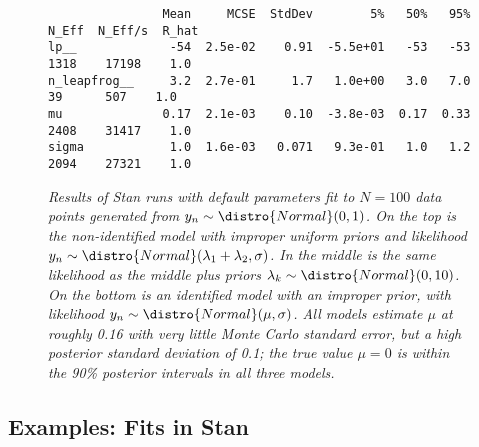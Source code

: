 \begin{figure}
\begin{Verbatim}
                Mean     MCSE  StdDev        5%   50%   95%  N_Eff  N_Eff/s  R_hat
lp__             -54  2.5e-02    0.91  -5.5e+01   -53   -53   1318    17198    1.0
n_leapfrog__     3.2  2.7e-01     1.7   1.0e+00   3.0   7.0     39      507    1.0
mu              0.17  2.1e-03    0.10  -3.8e-03  0.17  0.33   2408    31417    1.0
sigma            1.0  1.6e-03   0.071   9.3e-01   1.0   1.2   2094    27321    1.0
\end{Verbatim}
%
\caption{\small\it Results of Stan runs with default parameters fit to
  $N=100$ data points generated from $y_n \sim \distro{Normal}(0,1)$.
  On the top is the non-identified model with improper uniform priors
  and likelihood $y_n \sim \distro{Normal}(\lambda_1 + \lambda_2,
  \sigma)$. 
  In the middle is the same likelihood as the middle plus priors
  $\lambda_k \sim \distro{Normal}(0,10)$. 
  On the bottom is an identified model with an improper prior, with
  likelihood  $y_n \sim \distro{Normal}(\mu,\sigma)$.  All models
  estimate $\mu$ at roughly 0.16 with very little Monte Carlo standard
  error, but a high posterior standard deviation of 0.1;  the true
  value $\mu=0$ is within the 90\% posterior intervals in all three models.
}%
\label{non-identified-stan-fits.figure}
\end{figure}
%

\subsection{Examples: Fits in Stan}

